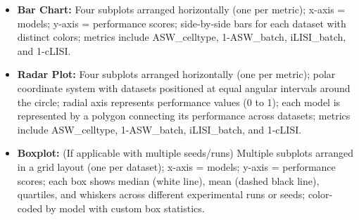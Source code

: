 \begin{itemize}
    \item \textbf{Bar Chart:} Four subplots arranged horizontally (one per metric); x-axis = models; y-axis = performance scores; side-by-side bars for each dataset with distinct colors; metrics include ASW\_celltype, 1-ASW\_batch, iLISI\_batch, and 1-cLISI.
    \item \textbf{Radar Plot:} Four subplots arranged horizontally (one per metric); polar coordinate system with datasets positioned at equal angular intervals around the circle; radial axis represents performance values (0 to 1); each model is represented by a polygon connecting its performance across datasets; metrics include ASW\_celltype, 1-ASW\_batch, iLISI\_batch, and 1-cLISI.
    \item \textbf{Boxplot:} (If applicable with multiple seeds/runs) Multiple subplots arranged in a grid layout (one per dataset); x-axis = models; y-axis = performance scores; each box shows median (white line), mean (dashed black line), quartiles, and whiskers across different experimental runs or seeds; color-coded by model with custom box statistics.
\end{itemize}
